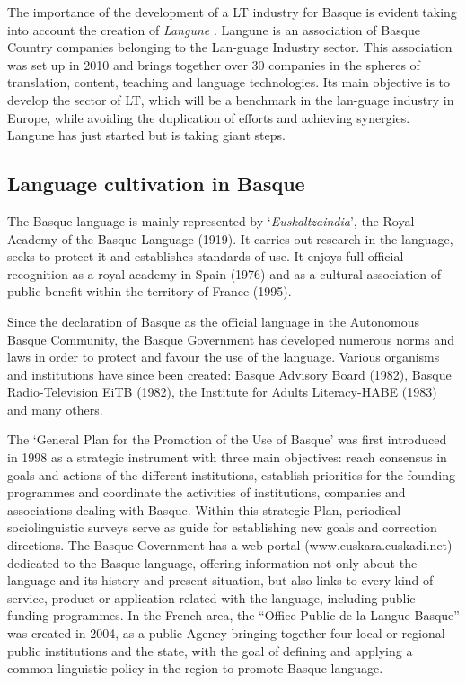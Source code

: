 \begin{multicols}{2}
The importance of the development of a LT industry for Basque is evident taking into account the creation of \textit{Langune}  \cite{BAS-Nota10}. Langune is an association of Basque Country companies belonging to the Lan-guage Industry sector. This association was set up in 2010 and brings together over 30 companies in the spheres of translation, content, teaching and language technologies. Its main objective is to develop the sector of LT, which will be a benchmark in the lan-guage industry in Europe, while avoiding the duplication of efforts and achieving synergies. Langune has just started but is taking giant steps.

\subsection{Language cultivation in Basque}
    The Basque language is mainly represented by ‘\textit{Euskaltzaindia}’, the Royal Academy of the Basque Language (1919). It carries out research in the language, seeks to protect it and establishes standards of use. It enjoys full official recognition as a royal academy in Spain (1976) and as a cultural association of public benefit within the territory of France (1995). 

Since the declaration of Basque as the official language in the Autonomous Basque Community, the Basque Government has developed numerous norms and laws in order to protect and favour the use of the language. Various organisms and institutions have since been created: Basque Advisory Board (1982), Basque Radio-Television EiTB (1982), the Institute for Adults Literacy-HABE (1983) and many others. 

The ‘General Plan for the Promotion of the Use of Basque’ was first introduced in 1998 as a strategic instrument with three main objectives: reach consensus in goals and actions of the different institutions, establish priorities for the founding programmes and coordinate the activities of institutions, companies and associations dealing with Basque. Within this strategic Plan, periodical sociolinguistic surveys serve as guide for establishing new goals and correction directions.  The Basque Government has a web-portal (www.euskara.euskadi.net) dedicated to the Basque language, offering information not only about the language and its history and present situation, but also links to every kind of service, product or application related with the language, including public funding programmes. In the French area, the “Office Public de la Langue Basque”  \cite{BAS-Nota11} was created in 2004, as a public Agency bringing together four local or regional public institutions and the state, with the goal of defining and applying a common linguistic policy in the region to promote Basque language.


\end{multicols}
